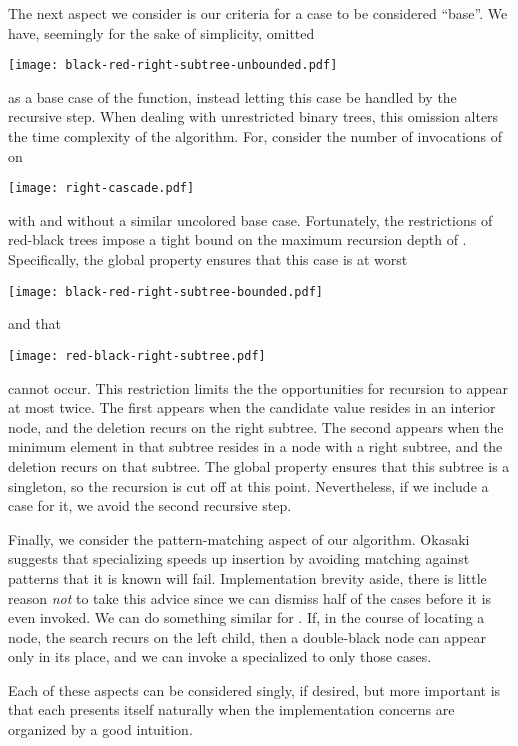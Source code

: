 \documentclass[preprint]{sigplanconf}
\begin{document}
The next aspect we consider is our criteria for a case to be considered ``base''. We have, seemingly for the sake of simplicity, omitted
\begin{center}
\texttt{[image: black-red-right-subtree-unbounded.pdf]}
\end{center}
as a base case of the  function, instead letting this case be handled by the recursive step. When dealing with unrestricted binary trees, this omission alters the time complexity of the algorithm. For, consider the number of invocations of  on
\begin{center}
\texttt{[image: right-cascade.pdf]}
\end{center}
with and without a similar uncolored base case. Fortunately, the restrictions of red-black trees impose a tight bound on the maximum recursion depth of . Specifically, the global property ensures that this case is at worst
\begin{center}
\texttt{[image: black-red-right-subtree-bounded.pdf]}
\end{center}
and that
\begin{center}
\texttt{[image: red-black-right-subtree.pdf]}
\end{center}
cannot occur. This restriction limits the the opportunities for recursion to appear at most twice. The first appears when the candidate value resides in an interior node, and the deletion recurs on the right subtree. The second appears when the minimum element in that subtree resides in a node with a right subtree, and the deletion recurs on that subtree. The global property ensures that this subtree is a singleton, so the recursion is cut off at this point. Nevertheless, if we include a case for it, we avoid the second recursive step.

Finally, we consider the pattern-matching aspect of our algorithm. Okasaki suggests that specializing  speeds up insertion by avoiding matching against patterns that it is known will fail. Implementation brevity aside, there is little reason \emph{not} to take this advice since we can dismiss half of the  cases before it is even invoked. We can do something similar for . If, in the course of locating a node, the search recurs on the left child, then a double-black node can appear only in its place, and we can invoke a  specialized to only those cases.

Each of these aspects can be considered singly, if desired, but more important is that each presents itself naturally when the implementation concerns are organized by a good intuition.
\end{document}

